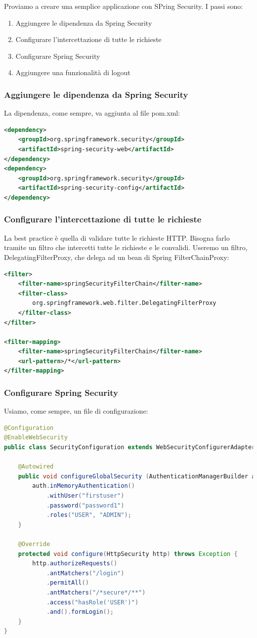 \documentclass[11pt,a4paper]{book}
\begin{document}
Proviamo a creare  una semplice applicazione con SPring Security. I passi sono:
\begin{enumerate}
	\item Aggiungere le dipendenza da Spring Security
	\item Configurare l'intercettazione di tutte le richieste
	\item Configurare Spring Security
	\item Aggiungere una funzionalità di logout
\end{enumerate}

\subsubsection{Aggiungere le dipendenza da Spring Security}
La dipendenza, come sempre, va aggiunta al file pom.xml:
\begin{lstlisting}[language = XML]
<dependency>
	<groupId>org.springframework.security</groupId>
	<artifactId>spring-security-web</artifactId>
</dependency>
<dependency>
	<groupId>org.springframework.security</groupId>
	<artifactId>spring-security-config</artifactId>
</dependency>
\end{lstlisting}

\subsubsection{Configurare l'intercettazione di tutte le richieste}
La best practice è quella di validare tutte le richieste HTTP. Bisogna farlo tramite un filtro che intercetti tutte le richieste e le convalidi. Useremo un filtro, DelegatingFilterProxy, che delega ad un bean di Spring FilterChainProxy:
\begin{lstlisting}[language = XML]
<filter>
	<filter-name>springSecurityFilterChain</filter-name>
	<filter-class>
		org.springframework.web.filter.DelegatingFilterProxy
	</filter-class>
</filter>

<filter-mapping>
	<filter-name>springSecurityFilterChain</filter-name>
	<url-pattern>/*</url-pattern>
</filter-mapping>
\end{lstlisting}

\subsubsection{Configurare Spring Security}
Usiamo, come sempre, un file di configurazione:
\begin{lstlisting}[language = Java]
@Configuration
@EnableWebSecurity
public class SecurityConfiguration extends WebSecurityConfigurerAdapter {
	
	@Autowired
	public void configureGlobalSecurity	(AuthenticationManagerBuilder auth) throws Exception {
		auth.inMemoryAuthentication()
			.withUser("firstuser")
			.password("password1")
			.roles("USER", "ADMIN");
	}

	@Override
	protected void configure(HttpSecurity http)	throws Exception {
		http.authorizeRequests()
			.antMatchers("/login")
			.permitAll()
			.antMatchers("/*secure*/**")
			.access("hasRole('USER')")
			.and().formLogin();
	}
}
\end{lstlisting}
\end{document}
